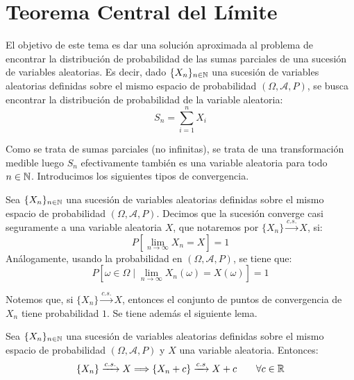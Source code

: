 \chapter{Teorema Central del Límite}

El objetivo de este tema es dar una solución aproximada al problema de encontrar la distribución de probabilidad de las sumas parciales de una sucesión de variables aleatorias. Es decir, dado $\{X_n\}_{n\in \mathbb{N}}$ una sucesión de variables aleatorias definidas sobre el mismo espacio de probabilidad $(\Omega, \mathcal{A}, P)$, se busca encontrar la distribución de probabilidad de la variable aleatoria:
\begin{equation*}
    S_n = \sum_{i=1}^{n} X_i
\end{equation*}

Como se trata de sumas parciales (no infinitas), se trata de una transformación medible luego $S_n$ efectivamente también es una variable aleatoria para todo $n\in \mathbb{N}$. Introducimos los siguientes tipos de convergencia.
\begin{definicion}
    Sea $\{X_n\}_{n\in \mathbb{N}}$ una sucesión de variables aleatorias definidas sobre el mismo espacio de probabilidad $(\Omega, \mathcal{A}, P)$. Decimos que la sucesión converge casi seguramente a una variable aleatoria $X$, que notaremos por $\{X_n\} \xrightarrow{c.s.} X$, si:
    \begin{equation*}
        P\left[\lim_{n\to \infty} X_n = X\right] = 1
    \end{equation*}
    Análogamente, usando la probabilidad en $(\Omega, \mathcal{A}, P)$, se tiene que:
    \begin{equation*}
        P\left[\omega\in \Omega\mid \lim_{n\to \infty} X_n(\omega) = X(\omega)\right] = 1
    \end{equation*}
\end{definicion}
Notemos que, si $\{X_n\} \xrightarrow{c.s.} X$, entonces el conjunto de puntos de convergencia de $X_n$ tiene probabilidad $1$. Se tiene además el siguiente lema.
\begin{lema}\label{lema:suma_convergencia_cs}
    Sea $\{X_n\}_{n\in \mathbb{N}}$ una sucesión de variables aleatorias definidas sobre el mismo espacio de probabilidad $(\Omega, \mathcal{A}, P)$ y $X$ una variable aleatoria. Entonces:
    \begin{equation*}
        \{X_n\} \xrightarrow{c.s.} X \Longrightarrow \{X_n+ c\} \xrightarrow{c.s} X + c \qquad \forall c\in \mathbb{R}
    \end{equation*}
\end{lema}
